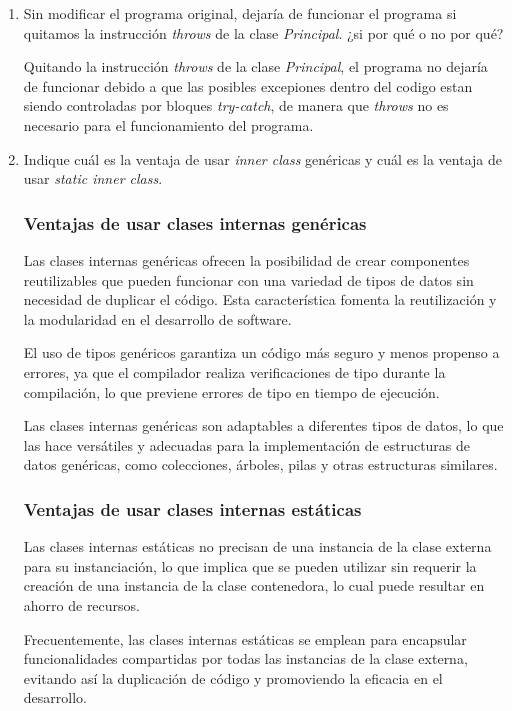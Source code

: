 \documentclass[11pt, twocolumn]{article}
\begin{document}
  \begin{enumerate}
    \item Sin modificar el programa original, dejaría de funcionar el programa si quitamos la instrucción \textit{throws} de la clase \textit{Principal}. ¿si por qué o no por qué?
    
    Quitando la instrucción \textit{throws} de la clase \textit{Principal}, el programa no dejaría de funcionar debido a que las posibles excepiones dentro del codigo estan siendo controladas por bloques \textit{try-catch}, de manera que \textit{throws} no es necesario para el funcionamiento del programa.

    \item Indique cuál es la ventaja de usar \textit{inner class} genéricas y cuál es la ventaja de usar \textit{static inner class}.
    
    \subsubsection*{Ventajas de usar clases internas genéricas}
    Las clases internas genéricas ofrecen la posibilidad de crear componentes reutilizables que pueden funcionar con una variedad de tipos de datos sin necesidad de duplicar el código. Esta característica fomenta la reutilización y la modularidad en el desarrollo de software.

    El uso de tipos genéricos garantiza un código más seguro y menos propenso a errores, ya que el compilador realiza verificaciones de tipo durante la compilación, lo que previene errores de tipo en tiempo de ejecución.

    Las clases internas genéricas son adaptables a diferentes tipos de datos, lo que las hace versátiles y adecuadas para la implementación de estructuras de datos genéricas, como colecciones, árboles, pilas y otras estructuras similares.

    \subsubsection*{Ventajas de usar clases internas estáticas}
    Las clases internas estáticas no precisan de una instancia de la clase externa para su instanciación, lo que implica que se pueden utilizar sin requerir la creación de una instancia de la clase contenedora, lo cual puede resultar en ahorro de recursos.

    Frecuentemente, las clases internas estáticas se emplean para encapsular funcionalidades compartidas por todas las instancias de la clase externa, evitando así la duplicación de código y promoviendo la eficacia en el desarrollo.


\end{enumerate}
\end{document}
